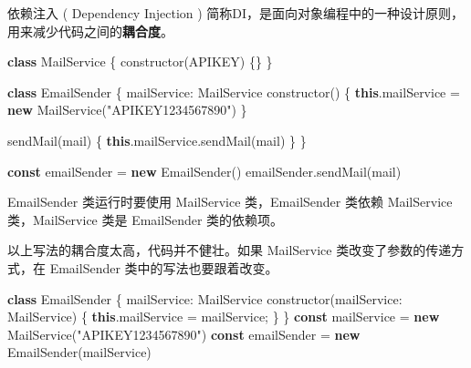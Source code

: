 \documentclass[
]{article}
\newenvironment{Shaded}{}{}
\newcommand{\AttributeTok}[1]{\textcolor[rgb]{0.49,0.56,0.16}{#1}}
\newcommand{\DataTypeTok}[1]{\textcolor[rgb]{0.56,0.13,0.00}{#1}}
\newcommand{\FunctionTok}[1]{\textcolor[rgb]{0.02,0.16,0.49}{#1}}
\newcommand{\KeywordTok}[1]{\textcolor[rgb]{0.00,0.44,0.13}{\textbf{#1}}}
\newcommand{\NormalTok}[1]{#1}
\newcommand{\OperatorTok}[1]{\textcolor[rgb]{0.40,0.40,0.40}{#1}}
\newcommand{\StringTok}[1]{\textcolor[rgb]{0.25,0.44,0.63}{#1}}
\begin{document}
依赖注入 ( Dependency Injection )
简称DI，是面向对象编程中的一种设计原则，用来减少代码之间的\textbf{耦合度}。

\begin{Shaded}
\begin{Highlighting}[]
\KeywordTok{class}\NormalTok{ MailService \{}
  \FunctionTok{constructor}\NormalTok{(APIKEY) \{\}}
\NormalTok{\}}

\KeywordTok{class}\NormalTok{ EmailSender \{}
  \DataTypeTok{mailService}\OperatorTok{:}\NormalTok{ MailService}
  \FunctionTok{constructor}\NormalTok{() \{}
    \KeywordTok{this}\OperatorTok{.}\AttributeTok{mailService} \OperatorTok{=} \KeywordTok{new} \FunctionTok{MailService}\NormalTok{(}\StringTok{"APIKEY1234567890"}\NormalTok{)}
\NormalTok{  \}}

  \FunctionTok{sendMail}\NormalTok{(mail) \{}
    \KeywordTok{this}\OperatorTok{.}\AttributeTok{mailService}\OperatorTok{.}\FunctionTok{sendMail}\NormalTok{(mail)}
\NormalTok{  \}}
\NormalTok{\}}

\KeywordTok{const}\NormalTok{ emailSender }\OperatorTok{=} \KeywordTok{new} \FunctionTok{EmailSender}\NormalTok{()}
\NormalTok{emailSender}\OperatorTok{.}\FunctionTok{sendMail}\NormalTok{(mail)}
\end{Highlighting}
\end{Shaded}

EmailSender 类运行时要使用 MailService 类，EmailSender 类依赖
MailService 类，MailService 类是 EmailSender 类的依赖项。

以上写法的耦合度太高，代码并不健壮。如果 MailService
类改变了参数的传递方式，在 EmailSender 类中的写法也要跟着改变。

\begin{Shaded}
\begin{Highlighting}[]
\KeywordTok{class}\NormalTok{ EmailSender \{}
  \DataTypeTok{mailService}\OperatorTok{:}\NormalTok{ MailService}
  \FunctionTok{constructor}\NormalTok{(}\DataTypeTok{mailService}\OperatorTok{:}\NormalTok{ MailService) \{}
    \KeywordTok{this}\OperatorTok{.}\AttributeTok{mailService} \OperatorTok{=}\NormalTok{ mailService}\OperatorTok{;}
\NormalTok{  \}}
\NormalTok{\}}
\KeywordTok{const}\NormalTok{ mailService }\OperatorTok{=} \KeywordTok{new} \FunctionTok{MailService}\NormalTok{(}\StringTok{"APIKEY1234567890"}\NormalTok{)}
\KeywordTok{const}\NormalTok{ emailSender }\OperatorTok{=} \KeywordTok{new} \FunctionTok{EmailSender}\NormalTok{(mailService)}
\end{Highlighting}
\end{Shaded}
\end{document}
